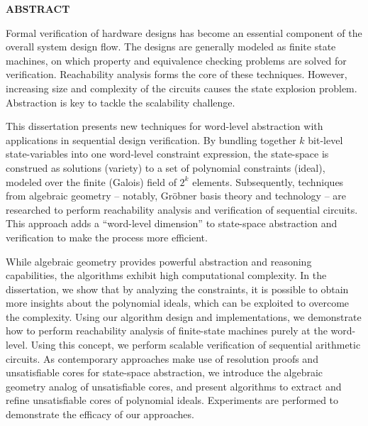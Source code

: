 \begin{center}{\bf ABSTRACT}\end{center}
Formal verification of hardware designs has become an essential
component of the overall system design flow. The designs are generally
modeled as finite state machines, on which property and equivalence
checking problems are solved for verification. Reachability analysis
forms the core of these techniques. However, increasing
size and complexity of the circuits causes the state explosion
problem. Abstraction is key to tackle the scalability challenge.

This dissertation presents new techniques for word-level abstraction
with applications in sequential design verification. By bundling
together $k$ bit-level state-variables into one word-level constraint 
expression, the state-space is construed as solutions (variety) to
a set of polynomial constraints (ideal), modeled over the finite
(Galois) field of $2^k$ elements. Subsequently, techniques from
algebraic geometry -- notably, Gr\"obner basis theory and technology
-- are researched to perform reachability analysis and
verification of sequential circuits. This approach adds a ``word-level
dimension'' to state-space abstraction and verification to make the
process more efficient.

While algebraic geometry provides powerful abstraction and reasoning
capabilities, the algorithms exhibit high computational complexity. In
the dissertation, we show that by analyzing the constraints, it is
possible to obtain more insights about the polynomial ideals, which can be
exploited to overcome the complexity. Using our algorithm design and
implementations, we demonstrate how to perform reachability
analysis of finite-state machines purely at the word-level. Using this
concept, we perform scalable verification of sequential arithmetic
circuits. As contemporary approaches make use of resolution proofs and
unsatisfiable cores for state-space abstraction, we introduce the
algebraic geometry analog of unsatisfiable cores, and present
algorithms to extract and refine unsatisfiable cores of polynomial
ideals. Experiments are performed to demonstrate the efficacy of our
approaches. 
